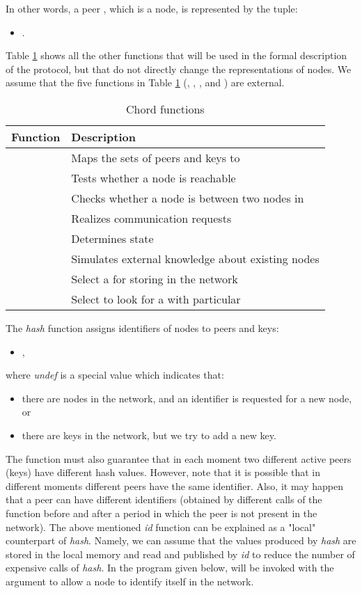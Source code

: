 \documentclass{amsart}
\theoremstyle{definition}
\begin{document}
In other words, a peer , which is a node, is represented by the tuple:
\begin{itemize}
    \item .
\end{itemize}

Table \ref{chord_functions} shows all the other functions that
will be used in the formal description of the protocol, but that
do not directly change the representations of nodes. We assume
that the five functions in Table \ref{chord_functions} (,
,
,  and ) are external.

\begin{table}
\centering
\begin{tabular}[]{|l|l|}
\hline \textbf{Function} & \textbf{Description}  \\
\hline
 & Maps the sets of peers and keys to \\
\hline
 & Tests whether a node is reachable \\
\hline
 & Checks whether a node is between two nodes in   \\
\hline
 & Realizes communication requests \\
\hline
 & Determines  state \\
\hline
 & Simulates external knowledge about existing nodes \\
\hline
 & Select a  for storing in the network\\
\hline
 & Select to look for a  with particular \\
\hline
\end{tabular}

\caption{Chord functions} \label{chord_functions}
\end{table}

The {\em hash} function assigns identifiers of nodes to peers and keys:
\begin{itemize}
    \item ,
\end{itemize}
where {\em undef} is a special value which indicates that:
\begin{itemize}
    \item there are  nodes in the network, and an identifier is requested for a new node, or
    \item there are  keys in the network, but we try to add a new key.
\end{itemize}
The function must also guarantee that in each moment two different active peers (keys) have different hash values. However, note that
it is possible that in different moments different peers have the same identifier. Also, it may happen that a peer can have different
identifiers (obtained by different calls of the  function before and after a period in which the peer is not present in the
network).
The above mentioned {\em id} function can be explained as a "local" counterpart of {\em hash}. Namely, we can assume that the values
produced by {\em hash} are stored in the local memory and read and published by {\em id} to reduce the number of expensive calls of
{\em hash}.
In the program given below,  will be invoked with the argument  to allow a node to identify itself in the network.
\end{document}
